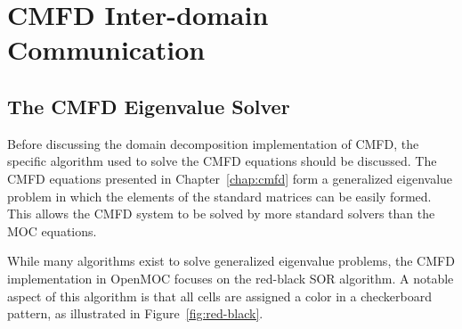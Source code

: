 \newpage
\section{CMFD Inter-domain Communication}
\label{sec:cmfd-dd}

\subsection{The CMFD Eigenvalue Solver}

Before discussing the domain decomposition implementation of \ac{CMFD}, the specific algorithm used to solve the \ac{CMFD} equations should be discussed. The \ac{CMFD} equations presented in Chapter~\ref{chap:cmfd} form a generalized eigenvalue problem in which the elements of the standard matrices can be easily formed. This allows the \ac{CMFD} system to be solved by more standard solvers than the \ac{MOC} equations.

While many algorithms exist to solve generalized eigenvalue problems, the \ac{CMFD} implementation in OpenMOC focuses on the red-black SOR algorithm. A notable aspect of this algorithm is that all cells are assigned a color in a checkerboard pattern, as illustrated in Figure~\ref{fig:red-black}. 

